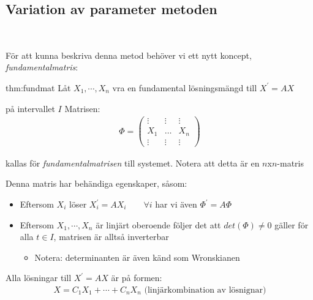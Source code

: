 \subsection{Variation av parameter metoden}\hfill\\
\par\bigskip
\noindent För att kunna beskriva denna metod behöver vi ett nytt koncept, \textit{fundamentalmatris}:
\par\bigskip
\begin{theo}[Fundamentalmatrisen]{thm:fundmat}
  Låt $X_1,\cdots,X_n$ vra en fundamental lösningsmängd till $X^{\prime} = AX$\par på intervallet $I$
  \noindent Matrisen:
  \begin{equation*}
    \begin{gathered}
      \Phi = \begin{pmatrix}\vdots&\vdots&\vdots\\X_1&\hdots&X_n\\\vdots&\vdots&\vdots\end{pmatrix}
    \end{gathered}
  \end{equation*}\par
  \noindent kallas för \textit{fundamentalmatrisen} till systemet. Notera att detta är en $n$x$n$-matris
\end{theo}
\par\bigskip
\noindent Denna matris har behändiga egenskaper, såsom:
\begin{itemize}
  \item Eftersom $X_i$ löser $X_i^{\prime} = AX_i\qquad\forall i$ har vi även $\Phi^{\prime} = A\Phi$
  \item Eftersom $X_1,\cdots,X_n$ är linjärt oberoende följer det att $det(\Phi)\neq0$ gäller för alla $t\in I$, matrisen är alltså inverterbar
    \begin{itemize}
      \item Notera: determinanten är även känd som Wronskianen
    \end{itemize}
\end{itemize}
\par\bigskip
\noindent Alla lösningar till $X^{\prime} = AX$ är på formen:
\begin{equation*}
  \begin{gathered}
    X = C_1X_1+\cdots+C_nX_n \text{ (linjärkombination av lösnignar)}
  \end{gathered}
\end{equation*}\par
